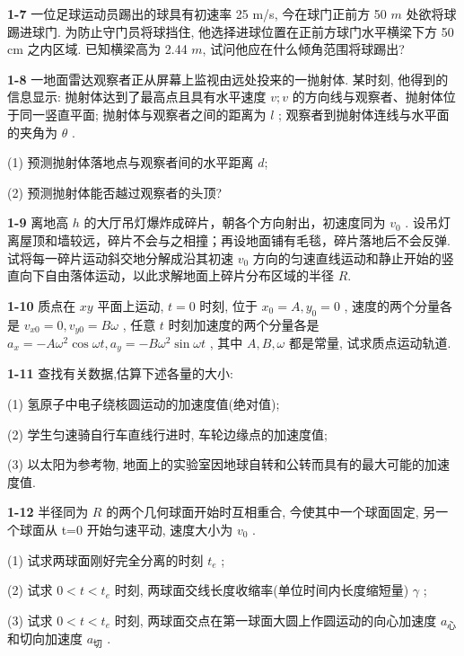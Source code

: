 \vfill

\textbf{1-7} 一位足球运动员踢出的球具有初速率 25 m/s, 今在球门正前方 50 $m$ 处欲将球踢进球门. 为防止守门员将球挡住, 他选择进球位置在正前方球门水平横梁下方 50 cm 之内区域. 已知横梁高为 2.44 $m$, 试问他应在什么倾角范围将球踢出?


\vfill

\newpage

\textbf{1-8} 一地面雷达观察者正从屏幕上监视由远处投来的一抛射体. 某时刻, 他得到的信息显示: 抛射体达到了最高点且具有水平速度 $v; v$ 的方向线与观察者、抛射体位于同一竖直平面; 抛射体与观察者之间的距离为 $l$ ; 观察者到抛射体连线与水平面的夹角为 $\theta$ .


(1) 预测抛射体落地点与观察者间的水平距离 $d$;


(2) 预测抛射体能否越过观察者的头顶?


\vfill

\textbf{1-9} 离地高 $h$ 的大厅吊灯爆炸成碎片，朝各个方向射出，初速度同为 $v_{0}$ . 设吊灯离屋顶和墙较远，碎片不会与之相撞；再设地面铺有毛毯，碎片落地后不会反弹. 试将每一碎片运动斜交地分解成沿其初速 $v_{0}$ 方向的匀速直线运动和静止开始的竖直向下自由落体运动，以此求解地面上碎片分布区域的半径 $R$.

\vfill

\newpage

\textbf{1-10} 质点在 $xy$ 平面上运动, $t = 0$ 时刻, 位于 $x_0 = A, y_0 = 0$ , 速度的两个分量各是 $v_{x0} = 0, v_{y0} = B\omega$ , 任意 $t$ 时刻加速度的两个分量各是 $a_x = -A\omega^2 \cos \omega t, a_y = -B\omega^2 \sin \omega t$ , 其中 $A, B, \omega$ 都是常量, 试求质点运动轨道.


\vfill

\textbf{1-11} 查找有关数据,估算下述各量的大小:


(1) 氢原子中电子绕核圆运动的加速度值(绝对值);


(2) 学生匀速骑自行车直线行进时, 车轮边缘点的加速度值;


(3) 以太阳为参考物, 地面上的实验室因地球自转和公转而具有的最大可能的加速度值.


\vfill

\newpage

\textbf{1-12} 半径同为 $R$ 的两个几何球面开始时互相重合, 今使其中一个球面固定, 另一个球面从 t=0 开始匀速平动, 速度大小为 $v_{0}$ .

(1) 试求两球面刚好完全分离的时刻 $t_{e}$ ;

(2) 试求 $0 < t < t_{e}$ 时刻, 两球面交线长度收缩率(单位时间内长度缩短量) $\gamma$ ;

(3) 试求 $0 < t < t_{e}$ 时刻, 两球面交点在第一球面大圆上作圆运动的向心加速度 $a_{心}$ 和切向加速度 $a_{切}$ .


